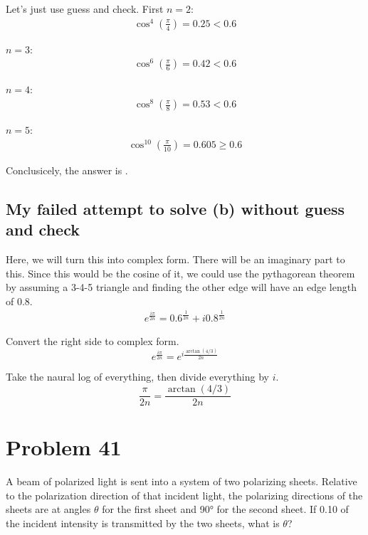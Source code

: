 \documentclass[12pt]{article}
\begin{document}
            Let's just use guess and check.
            First $n = 2$:
            \begin{align}
                \cos^{4}\left( \frac{\pi}{4} \right) = 0.25 < 0.6
            \end{align}

            $n = 3$:
            \begin{align}
                \cos^{6}\left( \frac{\pi}{6} \right) = 0.42 < 0.6
            \end{align}

            $n = 4$:
            \begin{align}
                \cos^{8}\left( \frac{\pi}{8} \right) = 0.53 < 0.6
            \end{align}

            $n = 5$:
            \begin{align}
                \cos^{10}\left( \frac{\pi}{10} \right) = 0.605 \geq 0.6
            \end{align}

            Conclusicely, the answer is . 

        \subsection{My failed attempt to solve (b) without guess and check}
            Here, we will turn this into complex form. 
            There will be an imaginary part to this.
            Since this would be the cosine of it, we could use the pythagorean theorem by assuming a 3-4-5 triangle and finding the other edge will have an edge length of $0.8$.
            \begin{gather}
                e^{\frac{i\pi}{2n}} = 0.6^{\frac{1}{2n}} + i 0.8^{\frac{1}{2n}}
            \end{gather}

            Convert the right side to complex form.
            \begin{equation}
                e^{\frac{i\pi}{2n}} = e^{i \frac{\arctan(4/3)}{2n}}
            \end{equation}

            Take the naural log of everything, then divide everything by $i$. 
            \begin{equation}
                \frac{\pi}{2n} = \frac{\arctan(4/3)}{2n}
            \end{equation}

    \pagebreak
    \section{Problem 41}
        A beam of polarized light is sent into a system of two polarizing sheets. 
        Relative to the polarization direction of that incident light, the polarizing directions of the sheets are at angles $\theta$ for the first sheet and 90\unit{\degree} for the second sheet. 
        If 0.10 of the incident intensity is transmitted by the two sheets, what is $\theta$?
\end{document}
